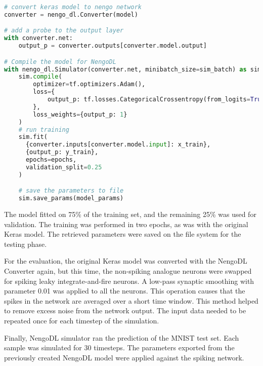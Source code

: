 \begin{lstlisting}[language=Python, caption=Conversion with NengoDL Converter class., label=lst:train_nengo, frame=single, breaklines]
# convert keras model to nengo network
converter = nengo_dl.Converter(model)

# add a probe to the output layer
with converter.net:
    output_p = converter.outputs[converter.model.output]

# Compile the model for NengoDL
with nengo_dl.Simulator(converter.net, minibatch_size=sim_batch) as sim:
    sim.compile(
        optimizer=tf.optimizers.Adam(),
        loss={
            output_p: tf.losses.CategoricalCrossentropy(from_logits=True)
        },
        loss_weights={output_p: 1}
    )
    # run training
    sim.fit(
      {converter.inputs[converter.model.input]: x_train}, 
      {output_p: y_train},
      epochs=epochs,
      validation_split=0.25
    )

    # save the parameters to file
    sim.save_params(model_params)
\end{lstlisting}

The model fitted on 75\% of the training set, and the remaining 25\% was used for validation. The training was performed in two epochs, as was with the original Keras model. The retrieved parameters were saved on the file system for the testing phase. \par
For the evaluation, the original Keras model was converted with the NengoDL Converter again, but this time, the non-spiking analogue neurons were swapped for spiking leaky integrate-and-fire neurons. A low-pass synaptic smoothing with parameter 0.01 was applied to all the neurons. This operation causes that the spikes in the network are averaged over a short time window. This method helped to remove excess noise from the network output. The input data needed to be repeated once for each timestep of the simulation. \par
Finally, NengoDL simulator ran the prediction of the MNIST test set. Each sample was simulated for 30 timesteps. The parameters exported from the previously created NengoDL model were applied against the spiking network.

